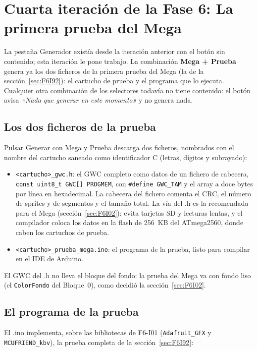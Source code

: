 \section{Cuarta iteración de la Fase 6: La primera prueba del Mega}\label{sec:F6I04}

La pestaña Generador existía desde la iteración anterior con el botón sin contenido; esta iteración le pone trabajo. La combinación \textbf{Mega + Prueba} genera ya los dos ficheros de la primera prueba del Mega (la de la sección~\ref{sec:F6I92}): el cartucho de prueba y el programa que lo ejecuta. Cualquier otra combinación de los selectores todavía no tiene contenido: el botón avisa \emph{«Nada que generar en este momento»} y no genera nada.

\subsection{Los dos ficheros de la prueba}
\label{sec:F6I04Ficheros}

Pulsar Generar con Mega y Prueba descarga dos ficheros, nombrados con el nombre del cartucho saneado como identificador C (letras, dígitos y subrayado):

\begin{itemize}
	\item \texttt{<cartucho>\_gwc.h}: el GWC completo como datos de un fichero de cabecera, \texttt{const uint8_t GWC[] PROGMEM}, con \texttt{\#define GWC\_TAM} y el array a doce bytes por línea en hexadecimal. La cabecera del fichero comenta el CRC, el número de sprites y de segmentos y el tamaño total. La vía del .h es la recomendada para el Mega (sección~\ref{sec:F6I02}): evita tarjetas SD y lecturas lentas, y el compilador coloca los datos en la flash de 256~KB del ATmega2560, donde caben los cartuchos de prueba.
	\item \texttt{<cartucho>\_prueba\_mega.ino}: el programa de la prueba, listo para compilar en el IDE de Arduino.
\end{itemize}

El GWC del .h no lleva el bloque del fondo: la prueba del Mega va con fondo liso (el \texttt{ColorFondo} del Bloque~0), como decidió la sección~\ref{sec:F6I02}.

\subsection{El programa de la prueba}
\label{sec:F6I04Ino}

El .ino implementa, sobre las bibliotecas de F6-I01 (\texttt{Adafruit\_GFX} y \texttt{MCUFRIEND\_kbv}), la prueba completa de la sección~\ref{sec:F6I92}:

